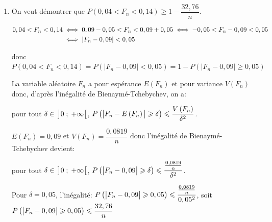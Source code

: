 \begin{enumerate}
\begin{enumerate}

		\item On veut démontrer que $P\left (0,04 < F_n < 0,14\right ) \geqslant 1 - \dfrac{32,76}{n}$.

$\aligned
0,04 < F_n < 0,14
& \iff 0,09-0,05 < F_n < 0,09+0,05
\iff -0,05 < F_n-0,09 < 0,05\\
& \iff \left | F_n-0,09 \right | < 0,05
\endaligned$

donc 
$P\left (0,04 < F_n < 0,14\right ) = P\left (\left | F_n-0,09 \right | < 0,05\right ) = 1-P \left (\left | F_n-0,09 \right |\geqslant 0,05\right ) $

La variable aléatoire $F_n$ a pour espérance $E\left (F_n\right )$ et pour variance $V\left (F_n\right )$ donc, d'après l'inégalité de Bienaymé-Tchebychev, on a:

pour tout $\delta\in\, \left ]0\;;\;+\infty\strut \right [$, 
$P\left (\left |F_n-E\left (F_n\right)\strut \right | \geqslant \delta \right ) \leqslant \dfrac{V\left (F_n\right  )}{\delta^2}$.

$E\left (F_n\right )=0,09$ et $V\left (F_n\right )= \dfrac{0,0819}{n}$ donc  l'inégalité de Bienaymé-Tchebychev devient:

pour tout $\delta\in\, \left ]0\;;\;+\infty\strut \right [$, 
$P\left ( \left |F_n-0,09\strut \right | \geqslant \delta \right ) \leqslant \dfrac{\frac{0,0819}{n}}{\delta^2}$.

Pour $\delta=0,05$, l'inégalité:
$P\left ( \left |F_n-0,09\strut \right | \geqslant 0,05 \right ) \leqslant \dfrac{\frac{0,0819}{n}}{0,05^2}$,
soit
$P\left ( \left |F_n-0,09\strut \right | \geqslant 0,05 \right ) \leqslant \dfrac{32,76}{n}$		
		

\end{enumerate}
\end{enumerate}
